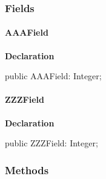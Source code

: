 \documentclass{report}
\begin{document}
\subsubsection*{\large{\textbf{Fields}}\normalsize\hspace{1ex}\hfill}
\paragraph*{AAAField}\hspace*{\fill}

\begin{list}{}{
\setlength{\itemindent}{0cm}
\setlength{\listparindent}{0cm}
\setlength{\leftmargin}{\evensidemargin}
\addtolength{\leftmargin}{\tmplength}
\settowidth{\labelsep}{X}
\addtolength{\leftmargin}{\labelsep}
\setlength{\labelwidth}{\tmplength}
}
\begin{flushleft}
\item[\textbf{Declaration}\hfill]
\begin{ttfamily}
public AAAField: Integer;\end{ttfamily}


\end{flushleft}
\end{list}
\paragraph*{ZZZField}\hspace*{\fill}

\begin{list}{}{
\setlength{\itemindent}{0cm}
\setlength{\listparindent}{0cm}
\setlength{\leftmargin}{\evensidemargin}
\addtolength{\leftmargin}{\tmplength}
\settowidth{\labelsep}{X}
\addtolength{\leftmargin}{\labelsep}
\setlength{\labelwidth}{\tmplength}
}
\begin{flushleft}
\item[\textbf{Declaration}\hfill]
\begin{ttfamily}
public ZZZField: Integer;\end{ttfamily}


\end{flushleft}
\end{list}
\subsubsection*{\large{\textbf{Methods}}\normalsize\hspace{1ex}\hfill}
\end{document}
